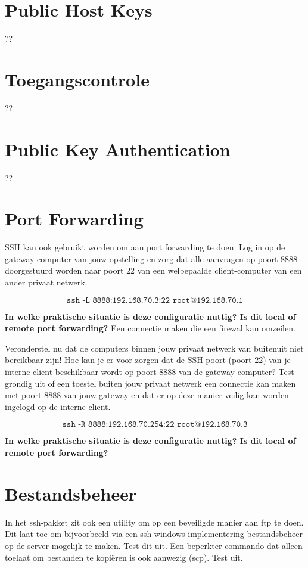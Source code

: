 \documentclass{report}
\begin{document}
\section{Public Host Keys}
??
\section{Toegangscontrole}
??
\section{Public Key Authentication}
??
\section{Port Forwarding}
SSH kan ook gebruikt worden om aan port forwarding te doen. Log in op de gateway-computer van jouw opstelling en zorg dat alle aanvragen op poort 8888 doorgestuurd worden naar poort 22 van een welbepaalde client-computer van een ander privaat netwerk.

$$\texttt{ssh -L 8888:192.168.70.3:22 root@192.168.70.1}$$

\textbf{In welke praktische situatie is deze configuratie nuttig? Is dit local of remote port forwarding?} Een connectie maken die een firewal kan omzeilen.


Veronderstel nu dat de computers binnen jouw privaat netwerk van buitenuit niet bereikbaar zijn! Hoe kan je er voor zorgen dat de SSH-poort (poort 22) van je interne client beschikbaar wordt op poort 8888 van de gateway-computer? Test grondig uit of een toestel buiten jouw privaat netwerk een connectie kan maken met poort 8888 van jouw gateway en dat er op deze manier veilig kan worden ingelogd op de interne client.

$$\texttt{ssh -R 8888:192.168.70.254:22 root@192.168.70.3}$$

\textbf{In welke praktische situatie is deze configuratie nuttig? Is dit local of remote port forwarding?}


\section{Bestandsbeheer}
 In het ssh-pakket zit ook een utility om op een beveiligde manier aan ftp te doen. Dit laat toe om bijvoorbeeld via een ssh-windows-implementering bestandsbeheer op de server mogelijk te maken. Test dit uit. Een beperkter commando dat alleen toelaat om bestanden te kopiëren is ook aanwezig (scp). Test uit. 
 
\end{document}
